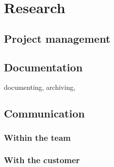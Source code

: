\chapter{Research}



\section{Project management}


\section{Documentation}
documenting, archiving,


\section{Communication}
\subsection{Within the team}
\subsection{With the customer}
